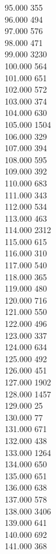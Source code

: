 { 95.000	355 \\
 96.000	494 \\
 97.000	576 \\
 98.000	471 \\
 99.000	3230 \\
 100.000	564 \\
 101.000	651 \\
 102.000	572 \\
 103.000	374 \\
 104.000	630 \\
 105.000	1504 \\
 106.000	329 \\
 107.000	394 \\
 108.000	595 \\
 109.000	392 \\
 110.000	683 \\
 111.000	343 \\
 112.000	534 \\
 113.000	463 \\
 114.000	2312 \\
 115.000	615 \\
 116.000	310 \\
 117.000	540 \\
 118.000	365 \\
 119.000	480 \\
 120.000	716 \\
 121.000	550 \\
 122.000	496 \\
 123.000	337 \\
 124.000	634 \\
 125.000	492 \\
 126.000	451 \\
 127.000	1902 \\
 128.000	1457 \\
 129.000	25 \\
 130.000	77 \\
 131.000	671 \\
 132.000	438 \\
 133.000	1264 \\
 134.000	650 \\
 135.000	651 \\
 136.000	638 \\
 137.000	578 \\
 138.000	3406 \\
 139.000	641 \\
 140.000	692 \\
 141.000	368 \\
}
